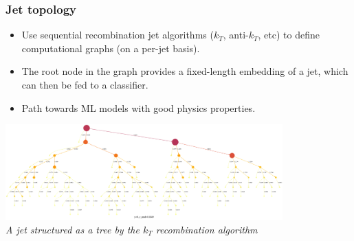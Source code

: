 \documentclass{beamer}
\begin{document}
\begin{frame}
    \frametitle{Jet topology}

    \begin{itemize}
        \item Use sequential recombination jet algorithms ($k_T$, anti-$k_T$, etc) to define computational graphs (on a per-jet basis).
        \item The root node in the graph provides a fixed-length embedding of a jet, which can then be fed to a classifier.
        \item Path towards ML models with good physics properties.
    \end{itemize}

    \vspace{0.5cm}

    \begin{center}
        \includegraphics[width=0.8\textwidth]{figures/4320-kt.png}\\
        \it A jet structured as a tree by the $k_T$ recombination algorithm
    \end{center}
\end{frame}
\end{document}
